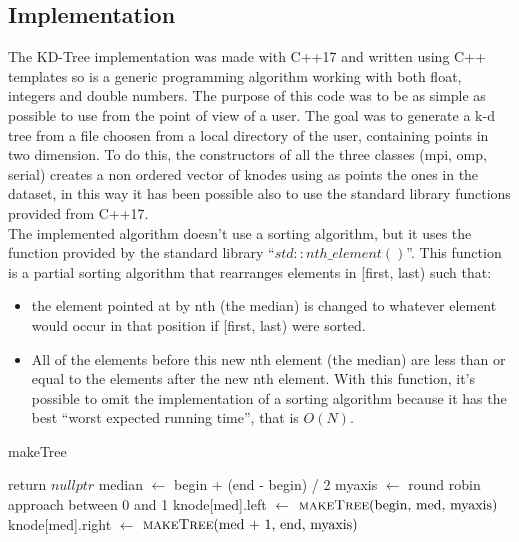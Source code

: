 \documentclass[11pt,a4paper]{article}
\begin{document}
\subsection{Implementation}
The KD-Tree implementation was made with C++17 and written using C++ templates so is a generic programming algorithm working with both float, integers and double numbers. The purpose of this code was to be as simple as possible to use from the point of view of a user. The goal was to generate a k-d tree from a file choosen from a local directory of the user, containing points in two dimension. To do this, the constructors of all the three classes (mpi, omp, serial) creates a non ordered vector of knodes using as points the ones in the dataset, in this way it has been possible also to use the standard library functions provided from C++17. \\
The implemented algorithm doesn’t use a sorting algorithm, but it uses the function provided by the standard
library “$std::nth\_element()$”. This function is a partial sorting algorithm that rearranges elements in [first,
last) such that:
\begin{center}
\begin{itemize}
\item the element pointed at by nth (the median) is changed to whatever element would occur in that position if [first, last) were sorted. \\
\item All of the elements before this new nth element (the median) are less than or equal to the elements after the new nth element. With this function, it’s possible to omit the implementation of a sorting algorithm because it has the best “worst expected running time”, that is $O(N)$. 
\end{itemize}
\end{center}
\begin{algorithm}
\caption{makeTree}
\begin{algorithmic}[1]
\State return $\textit{nullptr}$
\EndIf
\State median $\gets$ begin + (end - begin) / 2
\State {}
\State myaxis $\gets$ round robin approach between 0 and 1
\State knode[med].left $\gets$ $\Call{makeTree}{$begin, med, myaxis$}$
\State knode[med].right $\gets$ $\Call{makeTree}{$med + 1, end, myaxis$}$
\State \Return {}
\EndFunction
\end{algorithmic}
\end{algorithm}
\end{document}

